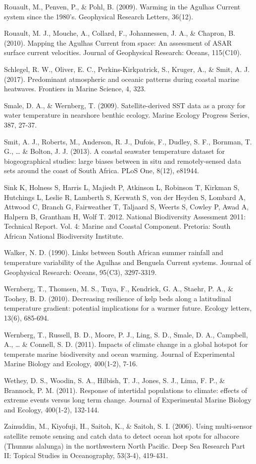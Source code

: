 \documentclass[12pt,]{article}
\begin{document}
Rouault, M., Penven, P., \& Pohl, B. (2009). Warming in the Agulhas
Current system since the 1980's. Geophysical Research Letters, 36(12).

Rouault, M. J., Mouche, A., Collard, F., Johannessen, J. A., \& Chapron,
B. (2010). Mapping the Agulhas Current from space: An assessment of ASAR
surface current velocities. Journal of Geophysical Research: Oceans,
115(C10).

Schlegel, R. W., Oliver, E. C., Perkins-Kirkpatrick, S., Kruger, A., \&
Smit, A. J. (2017). Predominant atmospheric and oceanic patterns during
coastal marine heatwaves. Frontiers in Marine Science, 4, 323.

Smale, D. A., \& Wernberg, T. (2009). Satellite-derived SST data as a
proxy for water temperature in nearshore benthic ecology. Marine Ecology
Progress Series, 387, 27-37.

Smit, A. J., Roberts, M., Anderson, R. J., Dufois, F., Dudley, S. F.,
Bornman, T. G., \ldots{} \& Bolton, J. J. (2013). A coastal seawater
temperature dataset for biogeographical studies: large biases between in
situ and remotely-sensed data sets around the coast of South Africa.
PLoS One, 8(12), e81944.

Sink K, Holness S, Harris L, Majiedt P, Atkinson L, Robinson T, Kirkman
S, Hutchings L, Leslie R, Lamberth S, Kerwath S, von der Heyden S,
Lombard A, Attwood C, Branch G, Fairweather T, Taljaard S, Weerts S,
Cowley P, Awad A, Halpern B, Grantham H, Wolf T. 2012. National
Biodiversity Assessment 2011: Technical Report. Vol. 4: Marine and
Coastal Component. Pretoria: South African National Biodiversity
Institute.

Walker, N. D. (1990). Links between South African summer rainfall and
temperature variability of the Agulhas and Benguela Current systems.
Journal of Geophysical Research: Oceans, 95(C3), 3297-3319.

Wernberg, T., Thomsen, M. S., Tuya, F., Kendrick, G. A., Staehr, P. A.,
\& Toohey, B. D. (2010). Decreasing resilience of kelp beds along a
latitudinal temperature gradient: potential implications for a warmer
future. Ecology letters, 13(6), 685-694.

Wernberg, T., Russell, B. D., Moore, P. J., Ling, S. D., Smale, D. A.,
Campbell, A., \ldots{} \& Connell, S. D. (2011). Impacts of climate
change in a global hotspot for temperate marine biodiversity and ocean
warming. Journal of Experimental Marine Biology and Ecology, 400(1-2),
7-16.

Wethey, D. S., Woodin, S. A., Hilbish, T. J., Jones, S. J., Lima, F. P.,
\& Brannock, P. M. (2011). Response of intertidal populations to
climate: effects of extreme events versus long term change. Journal of
Experimental Marine Biology and Ecology, 400(1-2), 132-144.

Zainuddin, M., Kiyofuji, H., Saitoh, K., \& Saitoh, S. I. (2006). Using
multi-sensor satellite remote sensing and catch data to detect ocean hot
spots for albacore (Thunnus alalunga) in the northwestern North Pacific.
Deep Sea Research Part II: Topical Studies in Oceanography, 53(3-4),
419-431.
\end{document}
